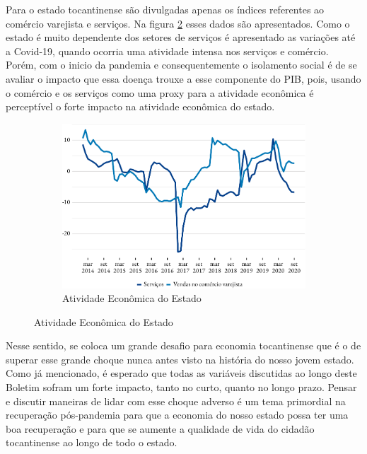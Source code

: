 \par Para o estado tocantinense são divulgadas apenas os índices referentes ao comércio varejista e serviços. Na figura \ref{fig:pmc} esses dados são apresentados. Como o estado é muito dependente dos setores de serviços é apresentado as variações até a Covid-19, quando ocorria uma atividade intensa nos serviços e comércio. Porém, com o inicio da pandemia e consequentemente o isolamento social é de se avaliar o impacto que essa doença trouxe a esse componente do PIB, pois, usando o comércio e os serviços como uma proxy para a atividade econômica é perceptível o forte impacto na atividade econômica do estado.

\begin{figure}[!h]
	\begin{subfigure}{\linewidth}
		\caption{Atividade Econômica do Estado}
		\label{fig:pmc}
		\includegraphics{fig/pmc_ibge-1.pdf}
	\end{subfigure}
\end{figure}

\par Nesse sentido, se coloca um grande desafio para economia tocantinense que é o de superar esse grande choque nunca antes visto na história do nosso jovem estado. Como já mencionado, é esperado que todas as variáveis discutidas ao longo deste Boletim sofram um forte impacto, tanto no curto, quanto no longo prazo. Pensar e discutir maneiras de lidar com esse choque adverso é um tema primordial na recuperação pós-pandemia para que a economia do nosso estado possa ter uma boa recuperação e para que se aumente a qualidade de vida do cidadão tocantinense ao longo de todo o estado.